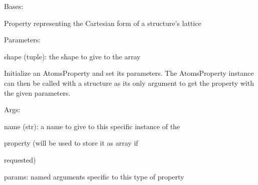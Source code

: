 \documentclass[letterpaper,10pt,english]{sphinxmanual}
\begin{document}
\begin{fulllineitems}
\label{doctree/soprano.properties.basic.basic:soprano.properties.basic.basic.LatticeCart}
Bases: {\hyperref[doctree/soprano.properties.atomsproperty:soprano.properties.atomsproperty.AtomsProperty]{\emph{}}}

Property representing the Cartesian form of a structure's lattice

\begin{DUlineblock}{0em}
\item[] Parameters:
\item[]
\begin{DUlineblock}{\DUlineblockindent}
\item[] shape (tuple): the shape to give to the array
\end{DUlineblock}
\end{DUlineblock}

Initialize an AtomsProperty and set its parameters.
The AtomsProperty instance can then be called with a structure as its
only argument to get the property with the given parameters.

\begin{DUlineblock}{0em}
\item[] Args:
\item[]
\begin{DUlineblock}{\DUlineblockindent}
\item[] name (str): a name to give to this specific instance of the
\item[]
\begin{DUlineblock}{\DUlineblockindent}
\item[] property (will be used to store it as array if
\item[] requested)
\end{DUlineblock}
\item[] params: named arguments specific to this type of property
\end{DUlineblock}
\end{DUlineblock}

\begin{fulllineitems}
\label{doctree/soprano.properties.basic.basic:soprano.properties.basic.basic.LatticeCart.default_name}
\end{fulllineitems}


\end{fulllineitems}
\end{document}
